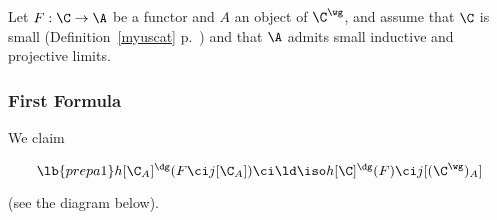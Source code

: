 \documentclass[12pt]{article}
\theoremstyle{remark}
\theoremstyle{definition}
\begin{document}


Let $F:\C\to\A$ be a functor and $A$ an object of $\C^\wg$, and assume that $\C$ is small (Definition~\ref{myuscat} p.~) and that $\A$ admits small inductive and projective limits.

\subsubsection{First Formula}


We claim 

\begin{equation}\lb{prepa1}
h[\C_A]^\dg(F\ci j[\C_A])\ci\ld\iso h[\C]^\dg(F)\ci j[(\C^\wg)_A]
\end{equation}

\nn(see the %
diagram  below).
\end{document}
